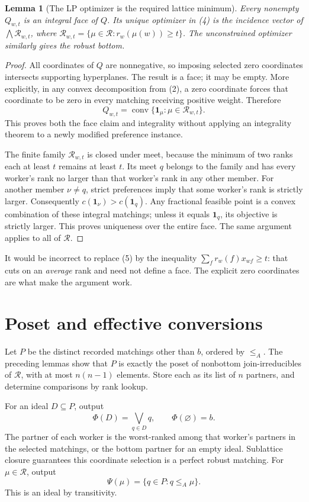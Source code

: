 \documentclass[11pt,a4paper]{article}
\newtheorem{lemma}[theorem]{Lemma}
\begin{document}
\begin{lemma}[The LP optimizer is the required lattice minimum]
Every nonempty $Q_{w,t}$ is an integral face of $Q$. Its unique optimizer in (4) is the incidence vector of $\bigwedge\mathcal R_{w,t}$, where
$\mathcal R_{w,t}=\{\mu\in\mathcal R:r_w(\mu(w))\ge t\}$.
The unconstrained optimizer similarly gives the robust bottom.
\end{lemma}
\begin{proof}
All coordinates of $Q$ are nonnegative, so imposing selected zero coordinates intersects supporting hyperplanes. The result is a face; it may be empty. More explicitly, in any convex decomposition from (2), a zero coordinate forces that coordinate to be zero in every matching receiving positive weight. Therefore
\[
 Q_{w,t}=\operatorname{conv}\{\mathbf1_\mu:
                                   \mu\in\mathcal R_{w,t}\}.
\]
This proves both the face claim and integrality without applying an integrality theorem to a newly modified preference instance.

The finite family $\mathcal R_{w,t}$ is closed under meet, because the minimum of two ranks each at least $t$ remains at least $t$. Its meet $q$ belongs to the family and has every worker's rank no larger than that worker's rank in any other member. For another member $\nu\ne q$, strict preferences imply that some worker's rank is strictly larger. Consequently $c(\mathbf1_\nu)>c(\mathbf1_q)$. Any fractional feasible point is a convex combination of these integral matchings; unless it equals $\mathbf1_q$, its objective is strictly larger. This proves uniqueness over the entire face. The same argument applies to all of $\mathcal R$.
\end{proof}

It would be incorrect to replace (5) by the inequality
$\sum_f r_w(f)x_{wf}\ge t$: that cuts on an \emph{average} rank and need not define a face. The explicit zero coordinates are what make the argument work.

\section{Poset and effective conversions}
Let $P$ be the distinct recorded matchings other than $b$, ordered by $\le_A$. The preceding lemmas show that $P$ is exactly the poset of nonbottom join-irreducibles of $\mathcal R$, with at most $n(n-1)$ elements. Store each as its list of $n$ partners, and determine comparisons by rank lookup.

For an ideal $D\subseteq P$, output
\[
 \Phi(D)=\bigvee_{q\in D}q,\qquad\Phi(\varnothing)=b.       \tag{6}
\]
The partner of each worker is the worst-ranked among that worker's partners in the selected matchings, or the bottom partner for an empty ideal. Sublattice closure guarantees this coordinate selection is a perfect robust matching. For $\mu\in\mathcal R$, output
\[
 \Psi(\mu)=\{q\in P:q\le_A\mu\}.                         \tag{7}
\]
This is an ideal by transitivity.
\end{document}
